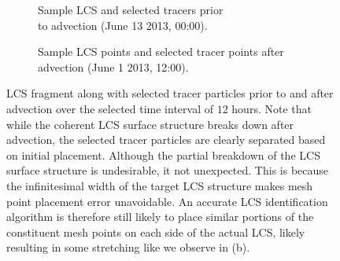 \begin{figure}[h!] 

\centering
\begin{subfigure}[b]{0.45\textwidth}
\centering

\caption{Sample LCS and selected tracers prior\\ to advection (June 13 2013, 00:00).}\label{fig:fjod_blob_test_a}
\end{subfigure}
\begin{subfigure}[b]{0.45\textwidth}
\centering

\caption{Sample LCS points and selected tracer points after advection (June 1 2013, 12:00).}\label{fig:fjord_blob_test_b}
\end{subfigure}

\caption{LCS fragment along with selected tracer particles prior to and after advection over the selected time interval of $12$ hours. Note that while the coherent LCS surface structure breaks down after advection, the selected tracer particles are clearly separated based on initial placement. Although the partial breakdown of the LCS surface structure is undesirable, it not unexpected. This is because the infinitesimal width of the target LCS structure makes mesh point placement error unavoidable. An accurate LCS identification algorithm is therefore still likely to place similar portions of the constituent mesh points on each side of the actual LCS, likely resulting in some stretching like we observe in (b).}\label{fig:fjord_blob_test}
\end{figure}